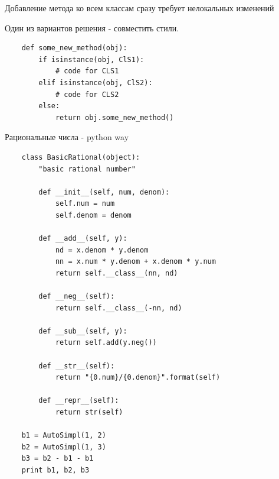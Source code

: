 \documentclass{article}
\begin{document}
\begin{center} Добавление метода ко всем классам сразу требует нелокальных изменений \end{center}
Один из вариантов решения - совместить стили.
\begin{lstlisting}
    def some_new_method(obj):
        if isinstance(obj, ClS1):
            # code for CLS1
        elif isinstance(obj, ClS2):
            # code for CLS2
        else:
            return obj.some_new_method()
\end{lstlisting}
\newpage

\begin{center} Рациональные числа - python way \end{center}
\begin{lstlisting}
    class BasicRational(object):
        "basic rational number"

        def __init__(self, num, denom):
            self.num = num
            self.denom = denom

        def __add__(self, y):
            nd = x.denom * y.denom
            nn = x.num * y.denom + x.denom * y.num
            return self.__class__(nn, nd)

        def __neg__(self):
            return self.__class__(-nn, nd)

        def __sub__(self, y):
            return self.add(y.neg())

        def __str__(self):
            return "{0.num}/{0.denom}".format(self)

        def __repr__(self):
            return str(self)

    b1 = AutoSimpl(1, 2)
    b2 = AutoSimpl(1, 3)
    b3 = b2 - b1 - b1
    print b1, b2, b3
\end{lstlisting}
\newpage

\end{document}
